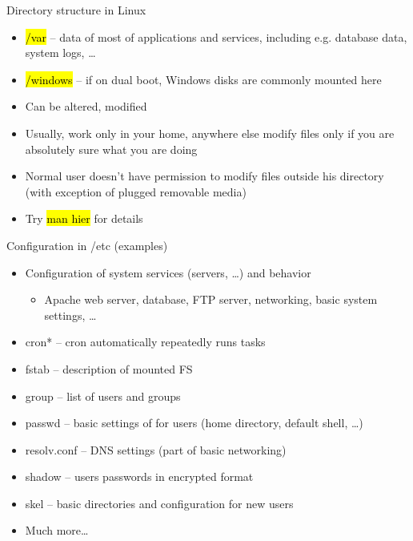 \documentclass[compress, ucs, xelatex, 11pt, xcolor=svgnames,
  hyperref={
    bookmarks=true,
    unicode=true,
    colorlinks=true,
    pdftitle={Linux, command line and MetaCentrum},
    plainpages=false,
    pdfauthor={Vojtech Zeisek},
    pdfsubject={Course about use of Linux command line, writing shell scripts and using MetaCentrum of CESNET},
    pdfcreator={XeLaTeX},
    pdfkeywords={Linux, GNU, BASH, shell, command line, MetaCentrum},
    linkcolor=Red,
    anchorcolor=Blue,
    citecolor=Purple,
    filecolor=DodgerBlue,
    menucolor=DarkOrchid,
    urlcolor=DeepSkyBlue,
    pdftex},
  url={hyphens, lowtilde} %
  ]{beamer}
\renewcommand{\texttt}[1]{\hl{\ttfamily #1}}
\begin{document}
\begin{frame}[allowframebreaks]{Directory structure in Linux}
\begin{itemize}
  \item \alert{\texttt{/var}} -- data of most of applications and services, including e.g. database data, system logs, \ldots
  \item \alert{\texttt{/windows}} -- if on dual boot, Windows disks are commonly mounted here
  \item Can be altered, modified
  \item Usually, work only in your home, anywhere else modify files only if you are absolutely sure what you are doing
  \item Normal user doesn't have permission to modify files outside his directory (with exception of plugged removable media)
  \item Try \texttt{man hier} for details
\end{itemize}
\end{frame}

\begin{frame}{Configuration in /etc (examples)}
\begin{itemize}
  \item Configuration of system services (servers, \ldots) and behavior
  \begin{itemize}
    \item Apache web server, database, FTP server, networking, basic system settings, \ldots
  \end{itemize}
  \item cron* -- cron automatically repeatedly runs tasks
  \item fstab -- description of mounted FS
  \item group -- list of users and groups
  \item passwd -- basic settings of for users (home directory, default shell, \ldots)
  \item resolv.conf --  DNS settings (part of basic networking)
  \item shadow -- users passwords in encrypted format
  \item skel -- basic directories and configuration for new users
  \item Much more\ldots
\end{itemize}
\end{frame}
\end{document}

